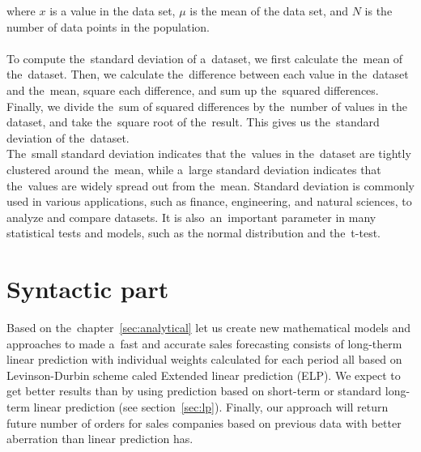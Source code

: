     where $x$ is a value in the data set, $\mu$ is the mean of the data set, and $N$ is the
    number of data points in the population.\\
    \\
    To compute the~standard deviation of a~dataset, we first calculate the~mean of the~dataset.
    Then, we calculate the~difference between each value in the~dataset and the~mean, square each difference, and
    sum up the~squared differences. Finally, we divide the~sum of squared differences by the~number of values in the
    dataset, and take the~square root of the~result. This gives us the~standard deviation of the~dataset.
    \\
    The~small standard deviation indicates that the~values in the~dataset are tightly clustered around the~mean,
    while a~large standard deviation indicates that the~values are widely spread out from the~mean. Standard
    deviation is commonly used in various applications, such as finance, engineering, and natural sciences, to
    analyze and compare datasets. It is also~an~important parameter in many statistical tests and models, such as the
    normal distribution and the~t-test.

\chapter{Syntactic part}\label{sec:syntactic}
Based on the~chapter~\ref{sec:analytical} let us create new mathematical models and approaches to made a~fast
and accurate sales forecasting consists of long-therm linear prediction with individual weights calculated for each
period all based on Levinson-Durbin scheme caled Extended linear prediction (ELP).
We expect to get better results than by using prediction based on short-term or standard long-term linear
prediction (see section~\ref{sec:lp}).  Finally, our approach will return future number of orders for sales companies
based on previous data with better aberration than linear prediction has.
    
